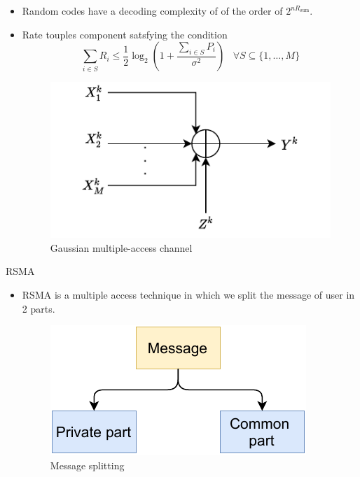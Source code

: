 \documentclass[10pt]{beamer}
\begin{document}
	\begin{frame}[t]{}\vspace{5pt}
		\begin{itemize}
			\item <1-> Random codes have a decoding complexity of of the order of $2^{nR_{\text{sum}}}$. 
	
	\item Rate touples component satsfying the condition
	\begin{equation}
		\sum_{i \in S}  R_i\leq \frac{1}{2}\log_2\left(1 + \frac{\sum_{i \in S} P_{i} }{\sigma^2} \right) \hspace{10pt}\forall S \subseteq \{ 1, \dots ,M\}
	\end{equation}
	 \begin{center}
	\begin{figure}[htb!]
		\centering
		\includegraphics[height=.3\textheight]{pic1.pdf}
		\caption{Gaussian multiple-access channel}
		\label{fig1}
	\end{figure}
\end{center}
	\end{itemize}
	\end{frame}
\begin{frame}[t]{RSMA}
	\begin{itemize}
		\item RSMA is a multiple access technique in which we split the message of user in 2 parts.
			\begin{figure}[htb!]
			\centering
			\includegraphics[height=.3\textheight]{pic_7.pdf}
			\caption{Message splitting}
			\label{fig1.1}
		\end{figure}
	\end{itemize}
	\end{frame}
\end{document}
